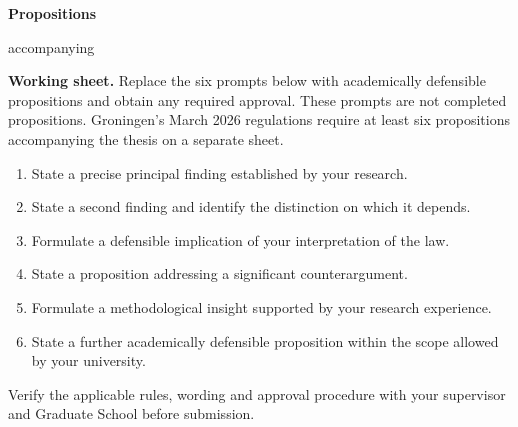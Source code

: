 \documentclass[12pt,a4paper]{article}
\begin{document}
\thispagestyle{empty}
\begin{center}
{\Large\bfseries Propositions}\par\medskip
accompanying\par\medskip
{\large\ThesisTitle}\par\medskip
\ThesisAuthor
\end{center}
\bigskip
\noindent\textbf{Working sheet.} Replace the six prompts below with academically
defensible propositions and obtain any required approval. These prompts are not
completed propositions. Groningen's March 2026 regulations require at least six
propositions accompanying the thesis on a separate sheet.
\bigskip
\begin{enumerate}[itemsep=12pt]
\item State a precise principal finding established by your research.
\item State a second finding and identify the distinction on which it depends.
\item Formulate a defensible implication of your interpretation of the law.
\item State a proposition addressing a significant counterargument.
\item Formulate a methodological insight supported by your research experience.
\item State a further academically defensible proposition within the scope allowed by your university.
\end{enumerate}
\vfill
\noindent\small Verify the applicable rules, wording and approval procedure
with your supervisor and Graduate School before submission.
\end{document}
